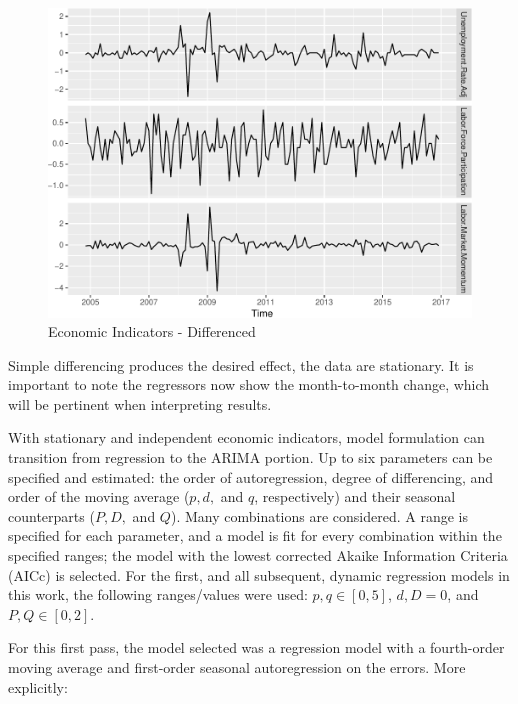 \documentclass[12pt,letterpaper,toc=flat,oneside]{report}
\theoremstyle{definition}
\theoremstyle{definition}
\theoremstyle{definition}
\theoremstyle{remark}
\begin{document}
\begin{figure}[H]

{\centering \includegraphics{elliott-econometric-personnel-retention-18_files/figure-latex/econ-vars-2-1} 

}

\caption{Economic Indicators - Differenced}\label{fig:econ-vars-2}
\end{figure}

Simple differencing produces the desired effect, the data are
stationary. It is important to note the regressors now show the
month-to-month change, which will be pertinent when interpreting
results.

With stationary and independent economic indicators, model formulation
can transition from regression to the ARIMA portion. Up to six
parameters can be specified and estimated: the order of autoregression,
degree of differencing, and order of the moving average (\(p,d,\) and
\(q\), respectively) and their seasonal counterparts (\(P,D,\) and
\(Q\)). Many combinations are considered. A range is specified for each
parameter, and a model is fit for every combination within the specified
ranges; the model with the lowest corrected Akaike Information Criteria
(AICc) is selected. For the first, and all subsequent, dynamic
regression models in this work, the following ranges/values were used:
\(p,q \in [0,5]\), \(d,D = 0\), and \(P, Q \in [0,2]\).

For this first pass, the model selected was a regression model with a
fourth-order moving average and first-order seasonal autoregression on
the errors. More explicitly:
\end{document}
